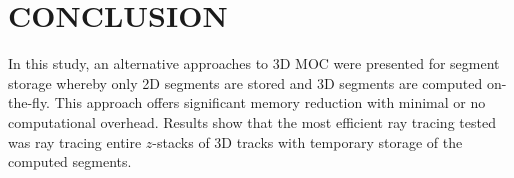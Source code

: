



%
\section{CONCLUSION} 

In this study, an alternative approaches to 3D MOC were presented for segment storage whereby only 2D segments are stored and 3D segments are computed on-the-fly. This approach offers significant memory reduction with minimal or no computational overhead. Results show that the most efficient ray tracing tested was ray tracing entire $z$-stacks of 3D tracks with temporary storage of the computed segments.
\clearpage

